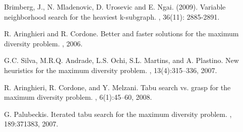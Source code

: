 \documentclass{ci5652}
\begin{document}
\begin{thebibliography}{99}

Brimberg, J., N. Mladenovic, D. Urosevic and E. Ngai. (2009).
\newblock Variable neighborhood search for the heaviest k-subgraph.
, 36(11): 2885-2891.

R. Aringhieri and R. Cordone.
\newblock Better and faster solutions for the maximum diversity problem.
, 2006.

G.C. Silva, M.R.Q. Andrade, L.S. Ochi, S.L. Martins, and A. Plastino.
\newblock New heuristics for the maximum diversity problem.
, 13(4):315–336, 2007.

R. Aringhieri, R. Cordone, and Y. Melzani.
\newblock Tabu search vs. grasp for the maximum diversity problem.
, 6(1):45–60, 2008.

G. Palubeckis.
\newblock Iterated tabu search for the maximum diversity problem.
, 189:371383, 2007.




\end{thebibliography}
\end{document}
